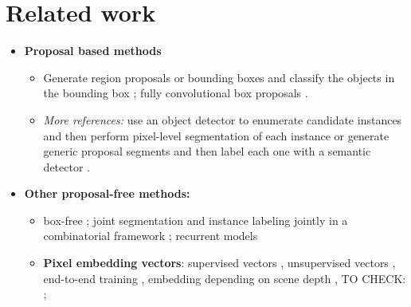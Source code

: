 
\section{Related work}
\begin{itemize}
\item \textbf{Proposal based methods} 
\begin{itemize}
\item Generate region proposals or bounding boxes and classify the objects in the bounding box \cite{yang2012layered,ladicky2010and,hariharan2014simultaneous,chen2015multi,dai2016instance,liang2016reversible,he2017mask}; fully convolutional  box proposals \cite{li2017fully}. 
\item \emph{More references:} use an object detector to enumerate candidate instances and then perform pixel-level segmentation of each instance \cite{liang2018proposal,dai2016instance,li2017fully,liang2016reversible,arnab2017pixelwise} or generate generic proposal segments and then label each one with a semantic detector \cite{hariharan2014simultaneous,chen2015multi,hariharan2015hypercolumns,dai2015convolutional,uhrig2016pixel,he2017mask}.
\end{itemize}

\item \textbf{Other proposal-free methods:} 
\begin{itemize}
\item box-free \cite{pinheiro2015learning,pinheiro2016learning,liang2018proposal,hu2017fastmask}; joint segmentation and instance labeling jointly in a combinatorial framework \cite{kirillov2017instancecut}; recurrent models \cite{romera2016recurrent,ren2017end}
\item \textbf{Pixel embedding vectors}: supervised vectors \cite{bai2017deep,liu2017sgn}, unsupervised vectors  \cite{fathi2017semantic,newell2017associative,de2017semantic}, end-to-end training \cite{kong2018recurrent}, embedding depending on scene depth \cite{uhrig2016pixel}, TO CHECK: \cite{sironi2014multiscale}; 


\end{itemize}
\end{itemize}
